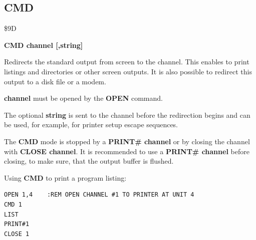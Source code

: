 \subsection{CMD}
\begin{description}[leftmargin=2cm,style=nextline]
\item [Token:] \$9D
\item [Format:] {\bf CMD channel [,string]}
\item [Usage:] Redirects the standard output
               from screen to the channel. This enables to
               print listings and directories or other screen outputs.
               It is also possible to redirect this output to a disk file
               or a modem.

               {\bf channel} must be opened by the {\bf OPEN} command.

               The optional {\bf string} is sent to the channel
               before the redirection begins and can be used,
               for example, for printer setup escape sequences.

\item [Remarks:] The {\bf CMD} mode is stopped by a {\bf PRINT\# channel}
                 or by closing the channel with {\bf CLOSE channel}.
                 It is recommended to use a {\bf PRINT\# channel}
                 before closing, to make sure, that the output buffer
                 is flushed.

\item [Example:] Using {\bf CMD} to print a program listing:
\begin{tcolorbox}[colback=black,coltext=white]
\verbatimfont{\codefont}
\begin{verbatim}
OPEN 1,4    :REM OPEN CHANNEL #1 TO PRINTER AT UNIT 4
CMD 1
LIST
PRINT#1
CLOSE 1
\end{verbatim}
\end{tcolorbox}
\end{description}


\newpage
